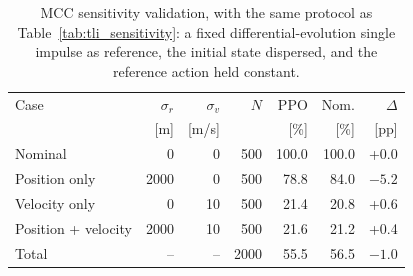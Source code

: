 \begin{table}[hbt!]
\centering
\small
\caption{MCC sensitivity validation, with the same protocol as Table~\ref{tab:tli_sensitivity}: a fixed differential-evolution single impulse as reference, the initial state dispersed, and the reference action held constant.}
\label{tab:mcc_sensitivity}
\begin{tabular}{lrrrrrr}
\toprule
Case & $\sigma_r$ & $\sigma_v$ & $N$ & PPO & Nom. & $\Delta$ \\
 & [m] & [m/s] & & [\%] & [\%] & [pp] \\
\midrule
Nominal & 0 & 0 & 500 & 100.0 & 100.0 & +0.0 \\
Position only & 2000 & 0 & 500 & 78.8 & 84.0 & $-5.2$ \\
Velocity only & 0 & 10 & 500 & 21.4 & 20.8 & +0.6 \\
Position + velocity & 2000 & 10 & 500 & 21.6 & 21.2 & +0.4 \\
\midrule
Total & -- & -- & 2000 & 55.5 & 56.5 & $-1.0$ \\
\bottomrule
\end{tabular}
\end{table}
